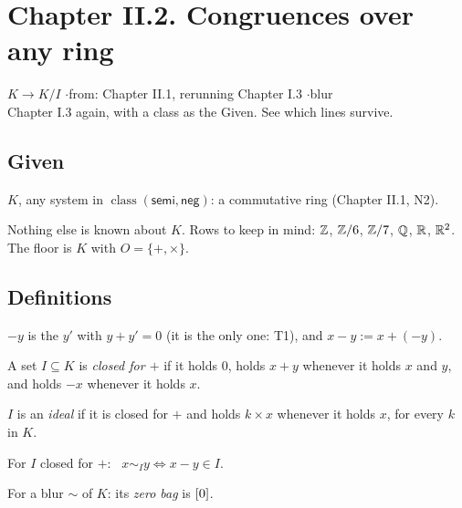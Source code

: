 \newpage

\section*{Chapter II.2. Congruences over any ring}
\begin{center}
{\normalsize $K \to K/I$ \quad$\cdot$\quad from: Chapter II.1, rerunning Chapter I.3 \quad$\cdot$\quad blur}\\[4pt]
{\small Chapter I.3 again, with a class as the Given. See which lines survive.}
\end{center}

\subsection*{Given}

\begin{lines}
\item[\lab{G1}] $K$, any system in $\operatorname{class}(\mathsf{semi}, \mathsf{neg})$: a commutative ring (Chapter II.1, N2).
\end{lines}
Nothing else is known about $K$. Rows to keep in mind: $\mathbb{Z}$, $\mathbb{Z}/6$, $\mathbb{Z}/7$, $\mathbb{Q}$, $\mathbb{R}$, $\mathbb{R}^2$. The floor is $K$ with $O = \{+, \times\}$.

\subsection*{Definitions}

\begin{lines}
\item[\lab{D1}] $-y$ is the $y'$ with $y + y' = 0$ (it is the only one: T1), and $x - y := x + (-y)$.
\item[\lab{D2}] A set $I \subseteq K$ is \emph{closed for $+$} if it holds $0$, holds $x + y$ whenever it holds $x$ and $y$, and holds $-x$ whenever it holds $x$.
\item[\lab{D3}] $I$ is an \emph{ideal} if it is closed for $+$ and holds $k \times x$ whenever it holds $x$, for every $k$ in $K$.
\item[\lab{D4}] For $I$ closed for $+$: \ $x \sim_I y \iff x - y \in I$.
\item[\lab{D5}] For a blur $\sim$ of $K$: its \emph{zero bag} is $[0]$.
\end{lines}

